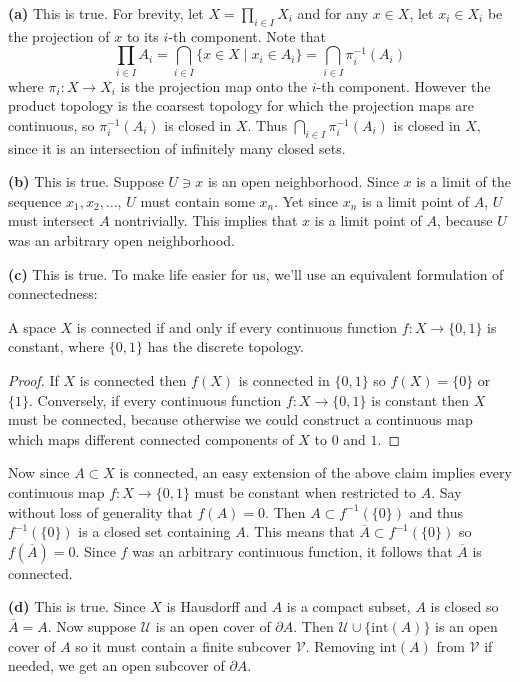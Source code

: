 \documentclass[11pt,letterpaper]{article}
\begin{document}
\begin{solution}
    \textbf{(a)} This is true. For brevity, let $X=\prod_{i\in I}X_i$ and for any $x\in X$, let $x_i\in X_i$ be the projection of $x$ to its $i$-th component. Note that \[
        \prod_{i\in I}A_i=\bigcap_{i\in I} \{x\in X \mid x_i\in A_i\} = \bigcap_{i\in I}\pi_i^{-1}(A_i)
    \]
    where $\pi_i : X \to X_i$ is the projection map onto the $i$-th component. However the product topology is the coarsest topology for which the projection maps are continuous, so $\pi_i^{-1}(A_i)$ is closed in $X$. Thus $\bigcap_{i\in I}\pi_i^{-1}(A_i)$ is closed in $X$, since it is an intersection of infinitely many closed sets.

    \textbf{(b)} This is true. Suppose $U\ni x$ is an open neighborhood. Since $x$ is a limit of the sequence $x_1,x_2,\ldots$, $U$ must contain some $x_n$. Yet since $x_n$ is a limit point of $A$, $U$ must intersect $A$ nontrivially. This implies that $x$ is a limit point of $A$, because $U$ was an arbitrary open neighborhood.
    
    \textbf{(c)} This is true. To make life easier for us, we'll use an equivalent formulation of connectedness:
    \begin{claim}
        A space $X$ is connected if and only if every continuous function $f : X \to \{0,1\}$ is constant, where $\{0,1\}$ has the discrete topology. 
    \end{claim}
    \begin{proof}
        If $X$ is connected then $f(X)$ is connected in $\{0,1\}$ so $f(X)=\{0\}$ or $\{1\}$. Conversely, if every continuous function $f : X \to \{0,1\}$ is constant then $X$ must be connected, because otherwise we could construct a continuous map which maps different connected components of $X$ to $0$ and $1$.   
    \end{proof}

    Now since $A\subset X$ is connected, an easy extension of the above claim implies every continuous map $f : X \to \{0,1\}$ must be constant when restricted to $A$. Say without loss of generality that $f(A)=0$. Then $A\subset f^{-1}(\{0\})$ and thus $f^{-1}(\{0\})$ is a closed set containing $A$. This means that $\overline{A}\subset f^{-1}(\{0\})$ so $f(\overline{A})=0$. Since $f$ was an arbitrary continuous function, it follows that $\overline{A}$ is connected.

    \textbf{(d)} This is true. Since $X$ is Hausdorff and $A$ is a compact subset, $A$ is closed so $\overline{A}=A$. Now suppose $\mathcal{U}$ is an open cover of $\partial A$. Then $\mathcal{U} \cup \{\textrm{int}(A)\}$ is an open cover of $A$ so it must contain a finite subcover $\mathcal{V}$. Removing $\textrm{int}(A)$ from $\mathcal{V}$ if needed, we get an open subcover of $\partial A$.  


\end{solution}
\end{document}
